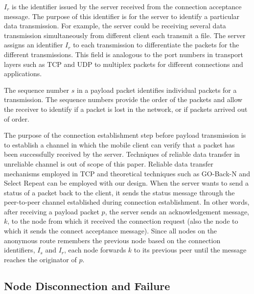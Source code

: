 $I_r$ is the identifier issued by the server received from the connection
acceptance message. The purpose of this identifier is for the server to identify
a particular data transmission. For example, the server could be receiving
several data transmission simultaneously from different client each transmit
a file. The server assigns an identifier $I_r$ to each transmission to
differentiate the packets for the different transmissions. This field is
analogous to the port numbers in transport layers such as TCP and UDP to
multiplex packets for different connections and applications.

The sequence number $s$ in a payload packet identifies individual packets
for a transmission. The sequence numbers provide the order of the packets
and allow the receiver to identify if a packet is lost in the network, or
if packets arrived out of order.

The purpose of the connection establishment step before payload transmission
is to establish a channel in which the mobile client can verify that a packet
has been successfully received by the server. Techniques of reliable data
transfer in unreliable channel is out of scope of this paper. Reliable data
transfer mechanisms employed in TCP\cite{RFC793} and theoretical techniques
such as GO-Back-N and Select Repeat\cite{book:Kurose} can be employed with
our design. When the server wants to send a status of a packet back to
the client, it sends the status message through the peer-to-peer channel
established during connection establishment. In other words, after receiving
a payload packet $p$, the server sends an acknowledgement message, $k$, to the
node from which it received the connection request (also the node to which
it sends the connect acceptance message). Since all nodes on the anonymous route
remembers the previous node based on the connection identifiers, $I_s$ and
$I_r$, each node forwards $k$ to its previous peer until the message
reaches the originator of $p$.


\subsection{Node Disconnection and Failure}

